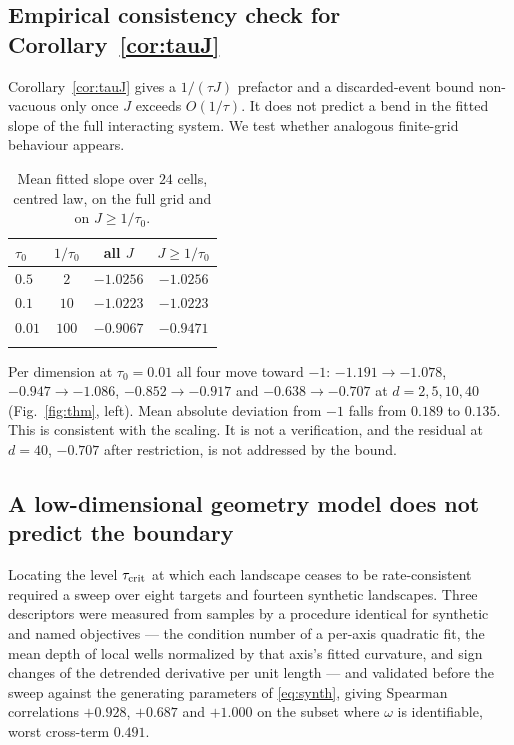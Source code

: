 \documentclass[pdflatex,sn-mathphys-num]{sn-jnl}
\theoremstyle{thmstyleone}
\theoremstyle{thmstyletwo}
\theoremstyle{thmstylethree}
\begin{document}
\subsection{Empirical consistency check for Corollary~\ref{cor:tauJ}}\label{sec:thmcheck}

Corollary~\ref{cor:tauJ} gives a $1/(\tau J)$ prefactor and a discarded-event bound non-vacuous only once $J$ exceeds $O(1/\tau)$. It does not predict a bend in the fitted slope of the full interacting system. We test whether analogous finite-grid behaviour appears.

\begin{table}[h]
\caption{Mean fitted slope over $24$ cells, centred law, on the full grid and on $J\ge1/\tau_0$.}\label{tab:thm}
\begin{tabular}{@{}lccc@{}}
\toprule
$\tau_0$ & $1/\tau_0$ & all $J$ & $J\ge1/\tau_0$\\
\midrule
$0.5$ & $2$ & $-1.0256$ & $-1.0256$\\
$0.1$ & $10$ & $-1.0223$ & $-1.0223$\\
$0.01$ & $100$ & $-0.9067$ & $-0.9471$\\
\botrule
\end{tabular}
\end{table}

Per dimension at $\tau_0=0.01$ all four move toward $-1$: $-1.191\to-1.078$, $-0.947\to-1.086$, $-0.852\to-0.917$ and $-0.638\to-0.707$ at $d=2,5,10,40$ (Fig.~\ref{fig:thm}, left). Mean absolute deviation from $-1$ falls from $0.189$ to $0.135$. This is consistent with the scaling. It is not a verification, and the residual at $d=40$, $-0.707$ after restriction, is not addressed by the bound.

\subsection{A low-dimensional geometry model does not predict the boundary}\label{sec:law}

Locating the level $\tau_{\rm crit}$ at which each landscape ceases to be rate-consistent required a sweep over eight targets and fourteen synthetic landscapes. Three descriptors were measured from samples by a procedure identical for synthetic and named objectives --- the condition number of a per-axis quadratic fit, the mean depth of local wells normalized by that axis's fitted curvature, and sign changes of the detrended derivative per unit length --- and validated before the sweep against the generating parameters of \eqref{eq:synth}, giving Spearman correlations $+0.928$, $+0.687$ and $+1.000$ on the subset where $\omega$ is identifiable, worst cross-term $0.491$.
\end{document}
